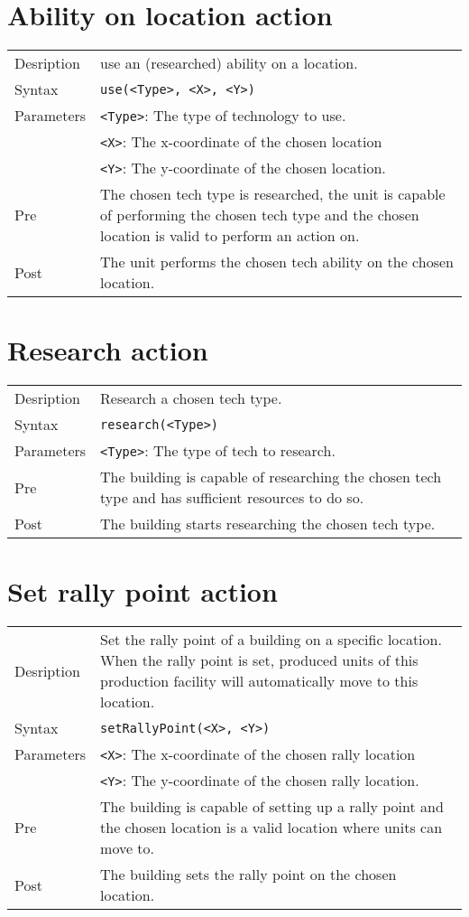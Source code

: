 \section{Ability on location action}
\begin{tabularx}{\textwidth}{lX}
 Desription & use an (researched) ability on a location. \\
 Syntax & \verb|use(<Type>, <X>, <Y>)| \\
 Parameters & \verb|<Type>|: The type of technology to use.\\
            & \verb|<X>|: The x-coordinate of the chosen location \\
            & \verb|<Y>|: The y-coordinate of the chosen location. \\
 Pre & The chosen tech type is researched, the unit is capable of performing the chosen tech type and the chosen location is valid to perform an action on. \\
 Post & The unit performs the chosen tech ability on the chosen location.
\end{tabularx}

\section{Research action}
\begin{tabularx}{\textwidth}{lX}
 Desription & Research a chosen tech type. \\
 Syntax & \verb|research(<Type>)| \\
 Parameters & \verb|<Type>|: The type of tech to research.\\
 Pre & The building is capable of researching the chosen tech type and has sufficient resources to do so. \\
 Post & The building starts researching the chosen tech type.
\end{tabularx}

\section{Set rally point action}
\begin{tabularx}{\textwidth}{lX}
 Desription & Set the rally point of a building on a specific location. When the rally point is set, produced units of this production facility will automatically move to this location. \\
 Syntax & \verb|setRallyPoint(<X>, <Y>)| \\
 Parameters & \verb|<X>|: The x-coordinate of the chosen rally location \\
            & \verb|<Y>|: The y-coordinate of the chosen rally location. \\
 Pre & The building is capable of setting up a rally point and the chosen location is a valid location where units can move to. \\
 Post & The building sets the rally point on the chosen location.
\end{tabularx}

